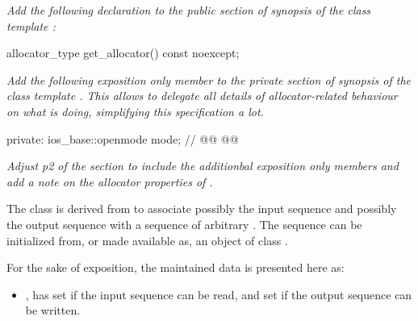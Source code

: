 \documentclass[ebook,11pt,article]{memoir}
\renewcommand{\iref}[1]{[#1]}
\begin{document}
\textit{Add the following declaration to the public section of synopsis of the class template :}
\begin{addedblock}
\begin{codeblock}
    allocator_type get_allocator() const noexcept;
\end{codeblock}
\end{addedblock}

\textit{Add the following exposition only member to the private section of synopsis of the class template . This allows to delegate all details of allocator-related behaviour on what  is doing, simplifying this specification a lot.}
\begin{codeblock}
  private:
    ios_base::openmode mode;  // \expos
    @@
    @@
\end{codeblock}


\emph{Adjust p2 of the section to include the additionbal exposition only members and add a note on the allocator properties of .}

\pnum
The class
is derived from
to associate possibly the input sequence and possibly
the output sequence with a sequence of arbitrary
.
The sequence can be initialized from, or made available as, an object of class
.


\pnum
For the sake of exposition, the maintained data  is presented here as:
\begin{itemize}
\item
{},
has
set if the input sequence can be read, and
set if the output sequence can be written.
\end{itemize}
\end{document}

